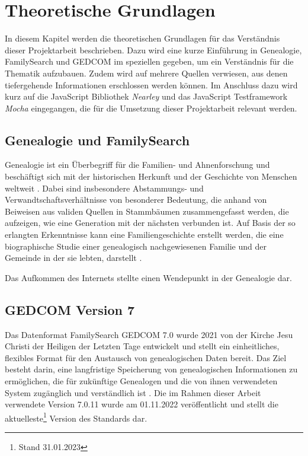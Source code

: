 \chapter{Theoretische Grundlagen}
\label{chap: Theoretische Grundlagen}
In diesem Kapitel werden die theoretischen Grundlagen für das Verständnis dieser Projektarbeit beschrieben. Dazu wird eine kurze Einführung in Genealogie, FamilySearch und GEDCOM im speziellen gegeben, um ein Verständnis für die Thematik aufzubauen. Zudem wird auf mehrere Quellen verwiesen, aus denen tiefergehende Informationen erschlossen werden können. Im Anschluss dazu wird kurz auf die JavaScript Bibliothek \textit{Nearley} und das JavaScript Testframework \textit{Mocha} eingegangen, die für die Umsetzung dieser Projektarbeit relevant werden.

\section{Genealogie und FamilySearch}
\label{sec: Genealogie und FamilySearch}
Genealogie ist ein Überbegriff für die Familien- und Ahnenforschung und beschäftigt sich mit der historischen Herkunft und der Geschichte von Menschen weltweit \cite{AhnenforschungDE}. Dabei sind insbesondere Abstammungs- und Verwandtschaftsverhältnisse von besonderer Bedeutung, die anhand von Beiweisen aus validen Quellen in Stammbäumen zusammengefasst werden, die aufzeigen, wie eine Generation mit der nächsten verbunden ist. Auf Basis der so erlangten Erkenntnisse kann eine Familiengeschichte erstellt werden, die eine biographische Studie einer genealogisch nachgewiesenen Familie und der Gemeinde in der sie lebten, darstellt \cite{SocietyOfGenealogists}.

Das Aufkommen des Internets stellte einen Wendepunkt in der Genealogie dar. 

\section{GEDCOM Version 7}
\label{sec: GEDCOM Version 7}
Das Datenformat FamilySearch GEDCOM 7.0 wurde 2021 von der Kirche Jesu Christi der Heiligen der Letzten Tage entwickelt und stellt ein einheitliches, flexibles Format für den Austausch von genealogischen Daten bereit. Das Ziel besteht darin, eine langfristige Speicherung von genealogischen Informationen zu ermöglichen, die für zukünftige Genealogen und die von ihnen verwendeten System zugänglich und verständlich ist \cite{GEDCOM}. Die im Rahmen dieser Arbeit verwendete Version 7.0.11 wurde am 01.11.2022 veröffentlicht und stellt die aktuelleste\footnote{Stand 31.01.2023} Version des Standards dar. 

